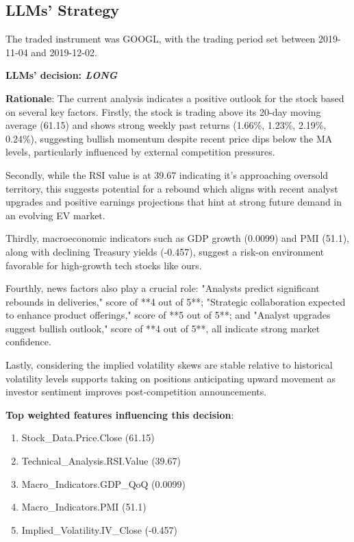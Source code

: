 \documentclass[8pt]{scrartcl}
\begin{document}
\newpage

\subsection*{LLMs' Strategy} \label{strategy3}

The traded instrument was GOOGL, with the trading period set between 2019-11-04 and 2019-12-02.

\textbf{LLMs' decision: \textit{LONG}}

\textbf{Rationale}: The current analysis indicates a positive outlook for the stock based on several key factors. Firstly, the stock is trading above its 20-day moving average (61.15) and shows strong weekly past returns (1.66\%, 1.23\%, 2.19\%, 0.24\%), suggesting bullish momentum despite recent price dips below the MA levels, particularly influenced by external competition pressures.

Secondly, while the RSI value is at 39.67 indicating it's approaching oversold territory, this suggests potential for a rebound which aligns with recent analyst upgrades and positive earnings projections that hint at strong future demand in an evolving EV market.

Thirdly, macroeconomic indicators such as GDP growth (0.0099) and PMI (51.1), along with declining Treasury yields (-0.457), suggest a risk-on environment favorable for high-growth tech stocks like ours.

Fourthly, news factors also play a crucial role: "Analysts predict significant rebounds in deliveries," score of **4 out of 5**; "Strategic collaboration expected to enhance product offerings," score of **5 out of 5**; and "Analyst upgrades suggest bullish outlook," score of **4 out of 5**, all indicate strong market confidence.

Lastly, considering the implied volatility skews are stable relative to historical volatility levels supports taking on positions anticipating upward movement as investor sentiment improves post-competition announcements.

\textbf{Top weighted features influencing this decision}:
\begin{enumerate}
    \item Stock\_Data.Price.Close (61.15)
    \item Technical\_Analysis.RSI.Value (39.67)
    \item Macro\_Indicators.GDP\_QoQ (0.0099)
    \item Macro\_Indicators.PMI (51.1)
    \item Implied\_Volatility.IV\_Close (-0.457)
\end{enumerate}
\end{document}
